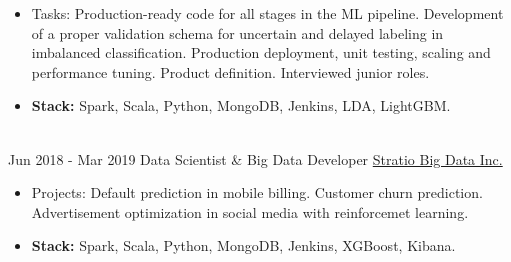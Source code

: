 \documentclass[letterpaper]{twentysecondcv} %
\begin{document}
\begin{twenty}
{\begin{itemize}
        \item Tasks: Production-ready code for all stages in the ML pipeline. Development of a proper validation schema for uncertain and delayed labeling in imbalanced classification. Production deployment, unit testing, scaling and performance tuning. Product definition. Interviewed junior roles.
        \item \textbf{Stack:} Spark, Scala, Python, MongoDB, Jenkins, LDA, LightGBM.
        \end{itemize}}
        \\
\twentyitem
    	{Jun 2018 -}
		{Mar 2019}
        {Data Scientist \& Big Data Developer}
        {\href{http://www.stratio.com/}{Stratio Big Data Inc.}}
        {}
        {\begin{itemize}
        \item Projects: Default prediction in mobile billing. Customer churn prediction. Advertisement optimization in social media with reinforcemet learning. 
        \item \textbf{Stack:} Spark, Scala, Python, MongoDB, Jenkins, XGBoost, Kibana. 
        \end{itemize}}
        \\     %

        
        

\end{twenty}
\end{document}
